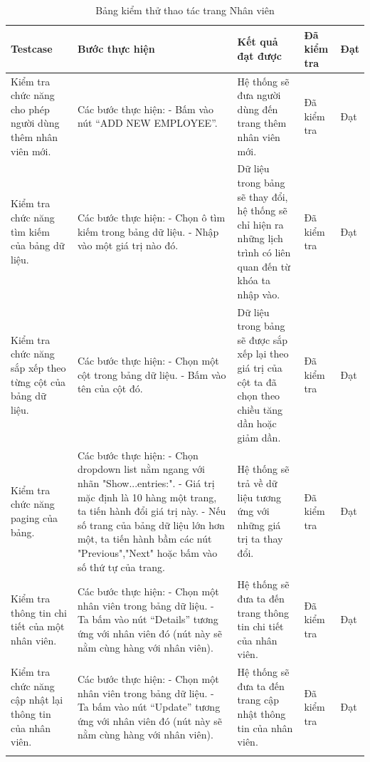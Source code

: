 \documentclass{article}
\begin{document}
\begin{longtable}{ | p{} |p{} | p{}  | p{}  | p{}  | } 
\hline
\textbf{Testcase}& \textbf{Bước thực hiện}& \textbf{Kết quả đạt được} & \textbf{Đã kiểm tra}& \textbf{Đạt} \\ 
\hline
\hline
Kiểm tra chức năng cho phép người dùng thêm nhân viên mới. &
Các bước thực hiện: \newline
- Bấm vào nút “ADD NEW EMPLOYEE”. 
&
Hệ thống sẽ đưa người dùng đến trang thêm nhân viên mới. &
Đã kiểm tra &
Đạt \\

\hline
Kiểm tra chức năng tìm kiếm của bảng dữ liệu. &
Các bước thực hiện: \newline
- Chọn ô tìm kiếm trong bảng dữ liệu. \newline
- Nhập vào một giá trị nào đó. 
&
Dữ liệu trong bảng sẽ thay đổi, hệ thống sẽ chỉ hiện ra những lịch trình có liên quan đến từ khóa ta nhập vào. &
Đã kiểm tra &
Đạt \\

\hline
Kiểm tra chức năng sắp xếp theo từng cột của bảng dữ liệu. &
Các bước thực hiện: \newline
- Chọn một cột trong bảng dữ liệu.  \newline
- Bấm vào tên của cột đó. 
&
Dữ liệu trong bảng sẽ được sắp xếp lại theo giá trị của cột ta đã chọn theo chiều tăng dần hoặc giảm dần. &
Đã kiểm tra &
Đạt \\

\hline
Kiểm tra chức năng paging của bảng. &
Các bước thực hiện: \newline
- Chọn dropdown list nằm ngang với nhãn "Show...entries:".  \newline
- Giá trị mặc định là 10 hàng một trang, ta tiến hành đổi giá trị này. \newline
- Nếu số trang của bảng dữ liệu lớn hơn một, ta tiến hành bầm các nút "Previous","Next" hoặc bấm vào số thứ tự của trang. 
&
Hệ thống sẽ trả về dữ liệu tương ứng với những giá trị ta thay đổi. &
Đã kiểm tra &
Đạt \\

\hline
Kiểm tra thông tin chi tiết của một nhân viên. &
Các bước thực hiện: \newline
- Chọn một nhân viên trong bảng dữ liệu.   \newline
- Ta bấm vào nút “Details” tương ứng với nhân viên đó (nút này sẽ nằm cùng hàng với nhân viên). 
&
Hệ thống sẽ đưa ta đến trang thông tin chi tiết của nhân viên. &
Đã kiểm tra &
Đạt \\

\hline
Kiểm tra chức năng cập nhật lại thông tin của nhân viên. &
Các bước thực hiện: \newline
- Chọn một nhân viên trong bảng dữ liệu.    \newline
- Ta bấm vào nút “Update” tương ứng với nhân viên đó (nút này sẽ nằm cùng hàng với nhân viên). 
&
Hệ thống sẽ đưa ta đến trang cập nhật thông tin của nhân viên. &
Đã kiểm tra &
Đạt \\

\hline
\caption{Bảng kiểm thử thao tác trang Nhân viên}
\end{longtable}
\end{document}

